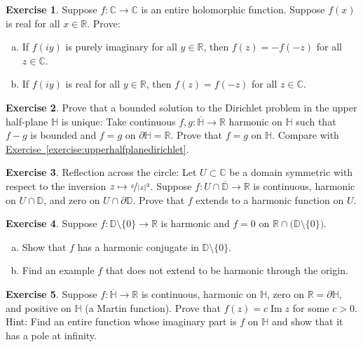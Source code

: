 \documentclass[12pt,openany]{book}
\renewcommand{\Im}{\operatorname{Im}}
\newcommand{\abs}[1]{\left\lvert {#1} \right\rvert}
\newcommand{\C}{{\mathbb{C}}}
\newcommand{\R}{{\mathbb{R}}}
\newcommand{\D}{{\mathbb{D}}}
\newcommand{\bH}{{\mathbb{H}}}
\theoremstyle{plain}
\theoremstyle{remark}
\theoremstyle{definition}
\newenvironment{exbox}{%
    \def\FrameCommand{\vrule width 1pt \relax\hspace{10pt}}%
    \MakeFramed{\advance\hsize-\width\FrameRestore}%
}{%
    \endMakeFramed
}
\newenvironment{exparts}{%
    \leavevmode\begin{enumerate}[a),noitemsep,topsep=0pt,parsep=0pt,partopsep=0pt]
}{%
    \end{enumerate}
}
\theoremstyle{exercise}
\newtheorem{exercise}{Exercise}[section]
\theoremstyle{example}
\newcommand{\exerciseref}[1]{\hyperref[#1]{Exercise~\ref*{#1}}}
\begin{document}
\begin{exbox}
\begin{exercise}
Suppose $f \colon \C \to \C$ is an entire holomorphic function.
Suppose $f(x)$ is real for all $x \in \R$. Prove:
\begin{exparts}
\item
If $f(iy)$ is purely imaginary for all $y \in \R$,
then $f(z)=-f(-z)$ for all $z \in \C$.
\item
If $f(iy)$ is real for all $y \in \R$,
then $f(z)=f(-z)$ for all $z \in \C$.
\end{exparts}
\end{exercise}

\begin{exercise} \label{exercise:Hdirichuniq}
Prove that a bounded solution to the Dirichlet problem in the
upper half-plane $\bH$ is unique:
Take continuous $f,g \colon \overline{\bH} \to \R$
harmonic on $\bH$ such that $f-g$ is bounded and
$f=g$ on $\partial \bH = \R$.  Prove that $f=g$ on $\bH$.
Compare with \exerciseref{exercise:upperhalfplanedirichlet}.
\end{exercise}

\begin{exercise}
Reflection across the circle:  Let $U \subset
\C$ be a domain symmetric with respect to the inversion $z \mapsto
\nicefrac{z}{\abs{z}^2}$.
Suppose $f \colon U \cap \overline{\D} \to \R$
is continuous, harmonic on $U \cap \D$, and
zero on $U \cap \partial \D$.
Prove that $f$ extends to a harmonic function on $U$.
\end{exercise}

\begin{exercise}
Suppose $f \colon \D \setminus \{ 0 \} \to \R$ is harmonic and $f = 0$
on $\R \cap \bigl( \D \setminus \{ 0 \} \bigr)$.
\begin{exparts}
\item
Show that $f$ has a harmonic conjugate in $\D \setminus \{ 0 \}$.
\item
Find an example $f$ that does not extend to be harmonic through the origin.
\end{exparts}
\end{exercise}

\begin{exercise}
Suppose $f \colon \overline{\bH} \to \R$ is continuous, harmonic on $\bH$, zero on $\R = \partial \bH$,
and positive on $\bH$  (a Martin function).
Prove that $f(z) = c \Im z$ for some $c > 0$.
Hint: Find an entire function whose imaginary part is $f$ on $\bH$ and
show that it has a pole at infinity.
\end{exercise}


\end{exbox}
\end{document}
